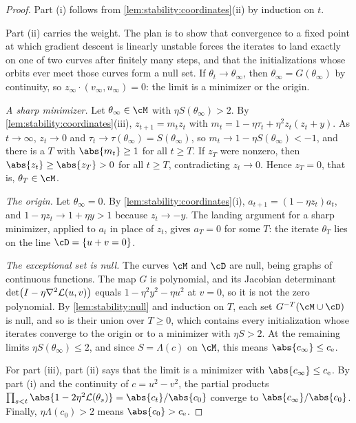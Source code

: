 \begin{refsection}
\begin{proof}
Part (i) follows from \cref{lem:stability:coordinates}(ii) by induction on $t$.

Part (ii) carries the weight. The plan is to show that convergence to a fixed point at which gradient descent is linearly unstable forces the iterates to land exactly on one of two curves after finitely many steps, and that the initializations whose orbits ever meet those curves form a null set. If $\theta_t\to\theta_\infty$, then $\theta_\infty=G(\theta_\infty)$ by continuity, so $z_\infty\cdot(v_\infty,u_\infty)=0$: the limit is a minimizer or the origin.

\emph{A sharp minimizer.} Let $\theta_\infty\in\cM$ with $\eta S(\theta_\infty)>2$. By \cref{lem:stability:coordinates}(iii), $z_{t+1}=m_tz_t$ with $m_t=1-\eta\tau_t+\eta^2z_t(z_t+y)$. As $t\to\infty$, $z_t\to0$ and $\tau_t\to\tau(\theta_\infty)=S(\theta_\infty)$, so $m_t\to1-\eta S(\theta_\infty)<-1$, and there is a $T$ with $\abs{m_t}\ge1$ for all $t\ge T$. If $z_T$ were nonzero, then $\abs{z_t}\ge\abs{z_T}>0$ for all $t\ge T$, contradicting $z_t\to0$. Hence $z_T=0$, that is, $\theta_T\in\cM$.

\emph{The origin.} Let $\theta_\infty=0$. By \cref{lem:stability:coordinates}(i), $a_{t+1}=(1-\eta z_t)a_t$, and $1-\eta z_t\to1+\eta y>1$ because $z_t\to-y$. The landing argument for a sharp minimizer, applied to $a_t$ in place of $z_t$, gives $a_T=0$ for some $T$: the iterate $\theta_T$ lies on the line $\cD=\{u+v=0\}$.

\emph{The exceptional set is null.} The curves $\cM$ and $\cD$ are null, being graphs of continuous functions. The map $G$ is polynomial, and its Jacobian determinant $\det\bigl(I-\eta\nabla^2\mathcal{L}(u,v)\bigr)$ equals $1-\eta^2y^2-\eta u^2$ at $v=0$, so it is not the zero polynomial. By \cref{lem:stability:null} and induction on $T$, each set $G^{-T}(\cM\cup\cD)$ is null, and so is their union over $T\ge0$, which contains every initialization whose iterates converge to the origin or to a minimizer with $\eta S>2$. At the remaining limits $\eta S(\theta_\infty)\le2$, and since $S=\Lambda(c)$ on $\cM$, this means $\abs{c_\infty}\le\stabce$.

For part (iii), part (ii) says that the limit is a minimizer with $\abs{c_\infty}\le\stabce$. By part (i) and the continuity of $c=u^2-v^2$, the partial products $\prod_{s<t}\abs{1-2\eta^2\Loss(\theta_s)}=\abs{c_t}/\abs{c_0}$ converge to $\abs{c_\infty}/\abs{c_0}$. Finally, $\eta\Lambda(c_0)>2$ means $\abs{c_0}>\stabce$.
\end{proof}


\end{refsection}
